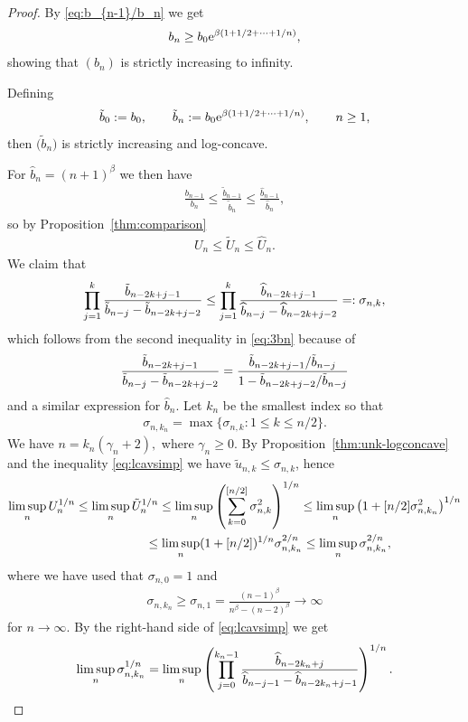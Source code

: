 \documentclass[pdftex]{sigma}
\numberwithin{equation}{section}
\begin{document}
\begin{proof} By \eqref{eq:b_{n-1}/b_n} we get
\begin{gather*}
b_n\ge b_0{\rm e}^{\beta(1+1/2+\dots +1/n)},
\end{gather*}
showing that $(b_n)$ is strictly increasing to infinity.

Defining{\samepage
\begin{gather*}
\tilde{b}_0:=b_0,\qquad \tilde{b}_n:=b_0 {\rm e}^{\beta(1+1/2+\dots + 1/n)},\qquad n\ge 1,
\end{gather*}
then $\big(\tilde{b}_n\big)$ is strictly increasing and log-concave.}

For $\widehat{b}_n=(n+1)^\beta$ we then have
\begin{gather}\label{eq:3bn}
\frac{b_{n-1}}{b_n}\le \frac{\tilde{b}_{n-1}}{\tilde{b}_n}\le \frac{\widehat{b}_{n-1}}{\widehat{b}_n},
\end{gather}
so by Proposition~\ref{thm:comparison}
\begin{gather*}
U_n\le \tilde{U}_n\le \widehat{U}_n.
\end{gather*}
We claim that
\begin{gather}\label{eq:lcavsimp}
\prod_{j=1}^k {\tilde{b}_{n-2k+j-1}\over \tilde{b}_{n-j}-\tilde{b}_{n-2k+j-2}}\le \prod_{j=1}^k {\widehat{b}_{n-2k+j-1}\over\widehat{b}_{n-j}-\widehat{b}_{n-2k+j-2}}=:\sigma_{n,k},
\end{gather}
which follows from the second inequality in \eqref{eq:3bn} because of
\begin{gather*}
{\tilde{b}_{n-2k+j-1}\over \tilde{b}_{n-j}-\tilde{b}_{n-2k+j-2}}=\frac{\tilde{b}_{n-2k+j-1}/\tilde{b}_{n-j}}{1-\tilde{b}_{n-2k+j-2}/\tilde{b}_{n-j}}
\end{gather*}
and a similar expression for $\widehat{b}_n$. Let $k_n$ be the smallest index so that
\begin{gather*}
\sigma_{n,k_n}=\max\{\sigma_{n,k}\colon 1\le k\le n/2\}.
\end{gather*}
We have $n=k_n(\gamma_n+2),$ where $\gamma_n\ge 0$.
By Proposition~\ref{thm:unk-logconcave} and the inequality \eqref{eq:lcavsimp} we have $\tilde{u}_{n,k}\le \sigma_{n,k}$, hence
\begin{gather}
 \limsup_n U_n^{1/n}\le \limsup_n \tilde{U}_n^{1/n}\le \limsup_n\left( \sum_{k=0}^{[n/2]}\sigma_{n,k}^2\right )^{1/n}\le \limsup_n\big(1+[n/2]\sigma_{n,k_n}^2\big)^{1/n}\nonumber\\
\hphantom{\limsup_n U_n^{1/n}}{} \le \limsup_n (1+[n/2])^{1/n}\sigma_{n,k_n}^{2/n} \le \limsup_n \sigma_{n,k_n}^{2/n},\label{eq:lcavsimp1}
\end{gather}
where we have used that $\sigma_{n,0}=1$ and
\begin{gather*}
\sigma_{n,k_n}\ge \sigma_{n,1}=\frac{(n-1)^\beta}{n^\beta-(n-2)^\beta}\to\infty
\end{gather*}
for $n\to\infty$. By the right-hand side of \eqref{eq:lcavsimp} we get
\begin{gather*}
\limsup_n\sigma_{n,k_n}^{1/n}= \limsup_n \left (\prod_{j=0}^{k_n-1} {\widehat{b}_{n-2k_n+j}\over \widehat{b}_{n-j-1}-\widehat{b}_{n-2k_n+j-1}}\right )^{1/n}.
\end{gather*}


\end{proof}
\end{document}
